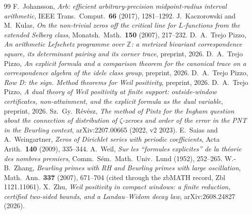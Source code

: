 \documentclass[11pt]{amsart}
\theoremstyle{definition}
\theoremstyle{remark}
\newcommand{\Z}{\mathbb Z}
\begin{document}
\begin{thebibliography}{99}
 F.~Johansson, \emph{Arb: efficient arbitrary-precision midpoint-radius interval
arithmetic}, IEEE Trans.\ Comput.\ \textbf{66} (2017), 1281--1292.
 J.~Kaczorowski and M.~Kulas, \emph{On the non-trivial zeros off the critical line for $L$-functions from the extended Selberg class}, Monatsh.\ Math.\ \textbf{150} (2007), 217--232. %
 D.~A.~Trejo Pizzo, \emph{An arithmetic Lefschetz programme over $\Z$: a metrized
bivariant correspondence square, its determinant pairing and its corner trace}, preprint, 2026.
 D.~A.~Trejo Pizzo, \emph{An explicit formula and a comparison theorem for the canonical trace on a correspondence
algebra of the idele class group}, preprint, 2026.
 D.~A.~Trejo Pizzo, \emph{Row D: the sign. Method theorems for Weil positivity}, preprint, 2026.
 D.~A.~Trejo Pizzo, \emph{A dual theory of Weil positivity at finite support:
outside-window certificates, non-attainment, and the explicit formula as the dual variable}, preprint, 2026.
 Sz.~Gy.~R\'ev\'esz, \emph{The method of Pintz for the Ingham question about the connection of distribution of $\zeta$-zeroes and order of the error in the PNT in the Beurling context}, arXiv:2207.00665 (2022, v2 2023).
 E.~Saias and A.~Weingartner, \emph{Zeros of Dirichlet series with periodic coefficients}, Acta Arith.\ \textbf{140} (2009), 335--344. %
 A.~Weil, \emph{Sur les ``formules explicites'' de la th\'eorie des nombres
premiers}, Comm.~S\'em.~Math.~Univ.~Lund (1952), 252--265.
 W.-B.~Zhang, \emph{Beurling primes with RH and Beurling primes with large oscillation}, Math.~Ann.\ \textbf{337} (2007), 671--704 (cited through the zbMATH record, Zbl 1121.11061).
 X.~Zhu, \emph{Weil positivity in compact windows: a finite reduction, certified
two-sided bounds, and a Landau--Widom decay law}, arXiv:2608.24827 (2026).
\end{thebibliography}
\end{document}
